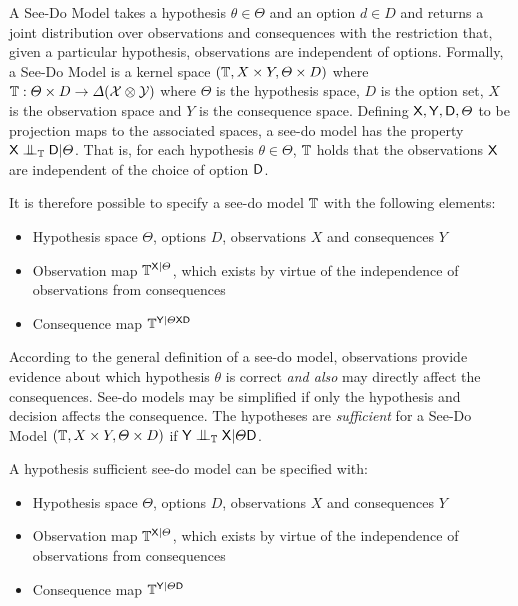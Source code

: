 \begin{definition}
A See-Do Model takes a hypothesis $\theta\in \Theta$ and an option $d\in D$ and returns a joint distribution over observations and consequences with the restriction that, given a particular hypothesis, observations are independent of options. Formally, a See-Do Model is a kernel space $(\mathbb{T},X\times Y, \Theta\times D)$ where $\mathbb{T}:\Theta\times D\to \Delta(\mathcal{X}\otimes\mathcal{Y})$ where $\Theta$ is the hypothesis space, $D$ is the option set, $X$ is the observation space and $Y$ is the consequence space. Defining $\mathsf{X},\mathsf{Y},\mathsf{D},\Theta$ to be projection maps to the associated spaces, a see-do model has the property $\RV{X}\CI_{\kernel{T}} \RV{D}|\Theta$. That is, for each hypothesis $\theta\in \Theta$, $\mathbb{T}$ holds that the observations $\mathsf{X}$ are independent of the choice of option $\mathsf{D}$.

It is therefore possible to specify a see-do model $\mathbb{T}$ with the following elements:
\begin{itemize}
    \item Hypothesis space $\Theta$, options $D$, observations $X$ and consequences $Y$
    \item Observation map $\mathbb{T}^{\mathsf{X}|\Theta}$, which exists by virtue of the independence of observations from consequences
    \item Consequence map $\mathbb{T}^{\mathsf{Y}|\Theta\mathsf{X}\mathsf{D}}$
\end{itemize}
\end{definition}

\begin{definition}
According to the general definition of a see-do model, observations provide evidence about which hypothesis $\theta$ is correct \emph{and also} may directly affect the consequences. See-do models may be simplified if only the hypothesis and decision affects the consequence. The hypotheses are \emph{sufficient} for a See-Do Model $(\mathbb{T},X\times Y, \Theta\times D)$ if $\RV{Y}\CI_{\kernel{T}} \RV{X}|\Theta\RV{D}$.

A hypothesis sufficient see-do model can be specified with:

\begin{itemize}
    \item Hypothesis space $\Theta$, options $D$, observations $X$ and consequences $Y$
    \item Observation map $\mathbb{T}^{\mathsf{X}|\Theta}$, which exists by virtue of the independence of observations from consequences
    \item Consequence map $\mathbb{T}^{\mathsf{Y}|\Theta\mathsf{D}}$
\end{itemize}
\end{definition}

